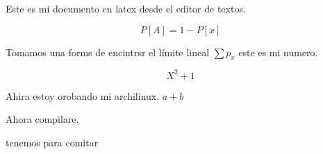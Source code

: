 \documentclass{article}
\begin{document}
Este es mi documento en latex desde el editor de textos. 

\begin{displaymath} 
 P[A] = 1 - P[x] 
\end{displaymath} 

 Tomamos una forms de encintrsr el límite lineal
 $ \sum p_x $  este es mi numero.
 
 \begin{displaymath}
    X^2 + 1
 \end{displaymath}
 
 Ahira estoy orobando mi archilinux. $a +b $ 
 
 Ahora compilare. 
 
 
 tenemos para comitar
\end{document}
